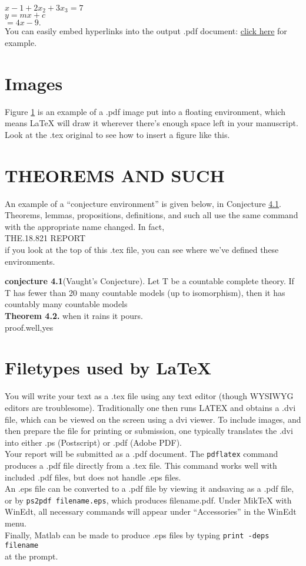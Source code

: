 \documentclass{article}
\begin{document}
$x-1+2x_2+3x_3=7$\\
$y=mx+c$\\
$=4x-9.$\\

You can easily embed hyperlinks into the output .pdf document:
\textcolor{blue}{\url{click here}} for example.
\section{Images}
Figure \textcolor{blue}{\url{1}} is an example of a .pdf image put into a floating environment, which means LaTeX will draw it wherever there’s enough space
left in your manuscript. Look at the .tex original to see how to insert
a figure like this.\\

\section{THEOREMS AND SUCH}
		An example of a “conjecture environment” is given below, in Conjecture \textcolor{blue}{\url{4.1}}. Theorems, lemmas, propositions, definitions, and such all
use the same command with the appropriate name changed. In fact,\\

\vspace*{1cm}
\footnotesize{THE.18.821 REPORT}\\
if you look at the top of this .tex file, you can see where we’ve defined
these environments.

\vspace*{0.5cm}
\textbf {conjecture 4.1}(Vaught’s Conjecture). Let T be a countable complete theory. If T has fewer than 20 many countable models (up to
isomorphism), then it has countably many countable models\\
	
\vspace*{0.2cm}
\textbf{Theorem 4.2.} when it rains it pours.\\
proof.well,yes
	\section{Filetypes used by LaTeX}
You will write your text as a .tex file using any text editor (though
WYSIWYG editors are troublesome). Traditionally one then runs
LATEX and obtains a .dvi file, which can be viewed on the screen using a
dvi viewer. To include images, and then prepare the file for printing or
submission, one typically translates the .dvi into either .ps (Postscript)
or .pdf (Adobe PDF).\\
Your report will be submitted as a .pdf document. The  \texttt{pdflatex}
command produces a .pdf file directly from a .tex file. This command
works well with included .pdf files, but does not handle .eps files.\\
An .eps file can be converted to a .pdf file by viewing it andsaving
as a .pdf file, or by \texttt{ps2pdf filename.eps}, which produces
filename.pdf. Under MikTeX with WinEdt, all necessary commands
will appear under “Accessories” in the WinEdt menu.\\
Finally, Matlab can be made to produce .eps files by typing
\texttt{print -deps filename}\\
at the prompt.
\end{document}
